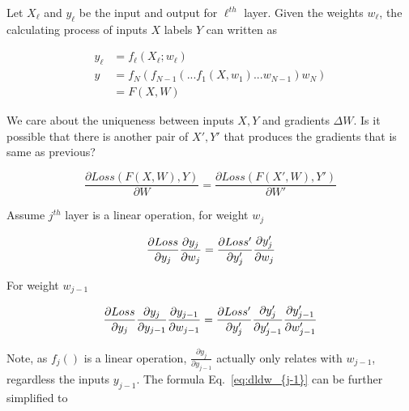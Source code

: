  

Let $X_\ell$ and $y_\ell$ be the input and output for $\ell^{th}$ layer. Given the weights $w_\ell$, the calculating process of inputs $X$ labels $Y$ can written as 

\begin{align*} 
    y_\ell &= f_\ell(X_\ell; w_\ell) \\
    y &=   f_{N} ( f_{N-1} ( ... f_1 (X, w_1) ...w_{N-1} ) w_N) \\
      &= F(X, W)
\end{align*}

We care about the uniqueness between inputs $X, Y$ and gradients $\Delta W$. Is it possible that there is another pair of $X', Y'$ that produces the gradients that is same as previous?


\begin{equation}
    \frac{\partial Loss(F(X, W), Y)}{\partial W} = \frac{\partial Loss(F(X', W), Y')}{\partial W'} 
\end{equation}


Assume $j^{th}$ layer is a linear operation, for weight $w_j$


\begin{equation}\label{eq:dldw_{j}}
    \frac{\partial Loss}{\partial y_{j}}
    \frac{\partial y_{j}}{\partial w_{j}}
    = 
    \frac{\partial Loss'}{\partial y'_{j}}
    \frac{\partial y'_{j}}{\partial w_{j}}
\end{equation}

For weight $w_{j-1}$

\begin{equation}\label{eq:dldw_{j-1}}
    \frac{\partial Loss}{\partial y_{j}}
    \frac{\partial y_{j}}{\partial y_{j-1}}
    \frac{\partial y_{j-1}}{\partial w_{j-1}}
    = 
    \frac{\partial Loss'}{\partial y'_{j}}
    \frac{\partial y'_{j}}{\partial y'_{j-1}}
    \frac{\partial y'_{j-1}}{\partial w'_{j-1}}
\end{equation}

Note, as $f_j()$ is a linear operation, $ \frac{\partial y_{j}}{\partial y_{j-1}}$ actually only relates with  $w_{j-1}$, regardless the inputs $ y_{j-1} $. The formula Eq.~\ref{eq:dldw_{j-1}} can be further simplified to 
 
